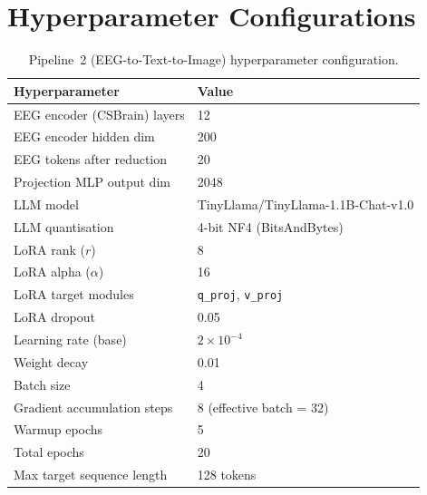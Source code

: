 \documentclass{article}
\begin{document}
\begin{enumerate}
\end{enumerate}

\appendix

\section{Hyperparameter Configurations}
\label{app:hyperparams}

\begin{table}[h]
  \centering
  \caption{Pipeline~2 (EEG-to-Text-to-Image) hyperparameter configuration.}
  \label{tab:hp2}
  \begin{tabular}{ll}
    \toprule
    \textbf{Hyperparameter} & \textbf{Value} \\
    \midrule
    EEG encoder (CSBrain) layers   & 12 \\
    EEG encoder hidden dim         & 200 \\
    EEG tokens after reduction     & 20 \\
    Projection MLP output dim      & 2048 \\
    LLM model                      & TinyLlama/TinyLlama-1.1B-Chat-v1.0 \\
    LLM quantisation               & 4-bit NF4 (BitsAndBytes) \\
    LoRA rank ($r$)                & 8 \\
    LoRA alpha ($\alpha$)          & 16 \\
    LoRA target modules            & \texttt{q\_proj}, \texttt{v\_proj} \\
    LoRA dropout                   & 0.05 \\
    Learning rate (base)           & $2 \times 10^{-4}$ \\
    Weight decay                   & 0.01 \\
    Batch size                     & 4 \\
    Gradient accumulation steps    & 8 (effective batch = 32) \\
    Warmup epochs                  & 5 \\
    Total epochs                   & 20 \\
    Max target sequence length     & 128 tokens \\
    \bottomrule
  \end{tabular}
\end{table}
\end{document}
